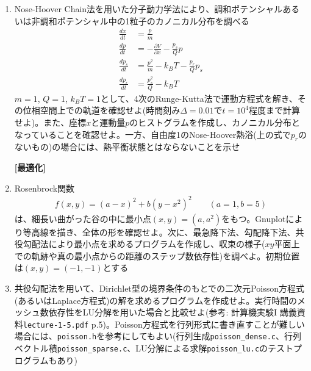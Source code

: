 \documentclass[11pt]{jarticle}
\begin{document}
\begin{enumerate}
\item Nose-Hoover Chain法を用いた分子動力学法により、調和ポテンシャルあるいは非調和ポテンシャル中の1粒子のカノニカル分布を調べる
  \begin{align*}
    \frac{dx}{dt} &= \frac{p}{m} \\
    \frac{dp}{dt} &= -\frac{\partial V}{\partial x} - \frac{p_s}{Q} p \\
    \frac{dp_s}{dt} &= \frac{p^2}{m} - k_B T - \frac{p_r}{Q} p_s \\
    \frac{dp_r}{dt} &= \frac{p_s^2}{Q} - k_B T
  \end{align*}
  $m=1$, $Q=1$, $k_BT=1$として、4次のRunge-Kutta法で運動方程式を解き、その位相空間上での軌道を確認せよ(時間刻み$\Delta=0.01$で$t=10^4$程度まで計算せよ)。また、座標$x$と運動量$p$のヒストグラムを作成し、カノニカル分布となっていることを確認せよ。一方、自由度1のNose-Hoover熱浴(上の式で$p_r$のないもの)の場合には、熱平衡状態とはならないことを示せ

\clearpage
  
\hspace*{-2em} {\bf [最適化]}

\item Rosenbrock関数
  \begin{align*}
    f(x,y) = (a - x)^2 + b(y-x^2)^2 \qquad (a=1, b=5)
  \end{align*}
  は、細長い曲がった谷の中に最小点$(x,y)=(a,a^2)$をもつ。Gnuplotにより等高線を描き、全体の形を確認せよ。次に、最急降下法、勾配降下法、共役勾配法により最小点を求めるプログラムを作成し、収束の様子($xy$平面上での軌跡や真の最小点からの距離のステップ数依存性)を調べよ。初期位置は$(x,y)=(-1,-1)$とする

\item 共役勾配法を用いて、Dirichlet型の境界条件のもとでの二次元Poisson方程式(あるいはLaplace方程式)の解を求めるプログラムを作成せよ。実行時間のメッシュ数依存性をLU分解を用いた場合と比較せよ(参考: 計算機実験I 講義資料{\tt lecture-1-5.pdf} p.5)。Poisson方程式を行列形式に書き直すことが難しい場合には、{\tt poisson.h}を参考にしてもよい(行列生成{\tt poisson\_dense.c}、行列ベクトル積{\tt poisson\_sparse.c}、LU分解による求解{\tt poisson\_lu.c}のテストプログラムもあり)


\end{enumerate}
\end{document}
